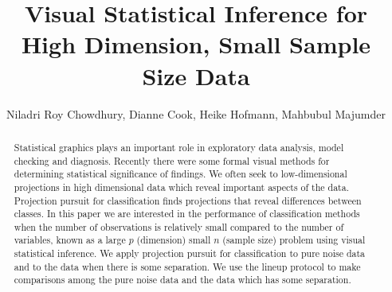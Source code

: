 \documentclass[12]{article}
\begin{document}



\title{Visual Statistical Inference for High Dimension, Small Sample Size Data}\label{ch:largepsmalln}
\vspace{-0.8cm}
\author{Niladri Roy Chowdhury, Dianne Cook, Heike Hofmann, Mahbubul Majumder}



\maketitle

\begin{abstract}
Statistical graphics plays an important role in exploratory data analysis, model checking and diagnosis. Recently there were some formal visual methods for determining statistical significance of findings. We often seek to low-dimensional projections in high dimensional data which reveal important aspects of the data. Projection pursuit for classification finds projections that reveal differences between classes. In this paper we are interested in the performance of classification methods when the number of observations is relatively small compared to the number of variables, known as a large $p$ (dimension) small $n$ (sample size) problem using visual statistical inference. We apply projection pursuit for classification to pure noise data and to the data when there is some separation. We use the lineup protocol \cite{buja:2009} to make comparisons among the pure noise data and the data which has some separation.

\end{abstract}
\end{document}
